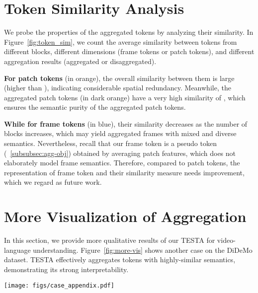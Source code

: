 \documentclass[11pt]{article}
\newcommand{\modelname}{TESTA\xspace}
\begin{document}
\section{Token Similarity Analysis}
\label{sec:token-sim}
We probe the properties of the aggregated tokens by analyzing their similarity. In Figure~\ref{fig:token_sim}, we count the average similarity between tokens from different blocks, different dimensions (frame tokens or patch tokens), and different aggregation results (aggregated or disaggregated). 


\textbf{For patch tokens} (in orange), the overall similarity between them is large (higher than ), indicating considerable spatial redundancy. Meanwhile, the aggregated patch tokens (in dark orange) have a very high similarity of , which ensures the semantic purity of the aggregated patch tokens. 

\textbf{While for frame tokens} (in blue), their similarity decreases as the number of blocks increases, which may yield aggregated frames with mixed and diverse semantics.
Nevertheless, recall that our frame token is a pseudo token (\textsection~\ref{subsubsec:agg-obj}) obtained by averaging patch features, which does not elaborately model frame semantics. Therefore, compared to patch tokens, the representation of frame token and their similarity measure needs improvement, which we regard as future work.

\section{More Visualization of Aggregation}
\label{sec:more-vis}
In this section, we provide more qualitative results of our \modelname for video-language understanding. Figure~\ref{fig:more-vis} shows another  case on the DiDeMo dataset. 
\modelname effectively aggregates tokens with highly-similar semantics, demonstrating its strong interpretability. 


\begin{figure*}[ht]
\centering
\texttt{[image: figs/case\_appendix.pdf]}
\caption{More visualizations of our aggregation on DiDeMo. Frames that are enclosed within the same rectangle, as well as patches that share the same inner and border color, are merged together.}
\label{fig:more-vis}
\end{figure*}
\end{document}
